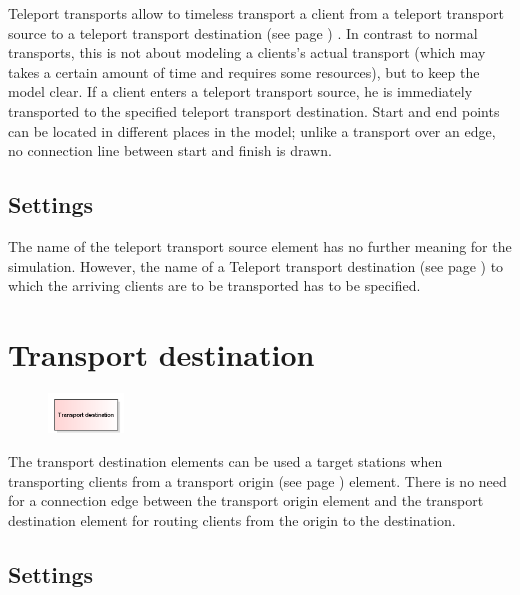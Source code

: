 Teleport transports allow to timeless transport a client from a teleport transport source
to a teleport transport destination (see page \pageref{ref:ModelElementTeleportDestination}) .
In contrast to normal transports, this is not about modeling a clients's actual transport
(which may takes a certain amount of time and requires some resources), but to keep the model clear.
If a client enters a teleport transport source, he is immediately transported to the specified
teleport transport destination. Start and end points can be located in different places in the model;
unlike a transport over an edge, no connection line between start and finish is drawn.

\subsection*{Settings}

The name of the teleport transport source element has no further meaning for the simulation.
However, the name of a Teleport transport destination (see page \pageref{ref:ModelElementTeleportDestination}) 
to which the arriving clients are to be transported has to be specified.


\section{Transport destination}
\label{ref:ModelElementTransportDestination}

\begin{figure}
\vspace{-22pt}
\includegraphics[width=2cm]{imageModelElementTransportDestination.png}
\vspace{-22pt}
\end{figure}

The transport destination elements can be used a target stations when transporting
clients from a transport origin (see page \pageref{ref:ModelElementTransportSource}) 
element. There is no need for a connection edge between the transport origin element
and the transport destination element for routing clients from the origin to the
destination.

\subsection*{Settings}

